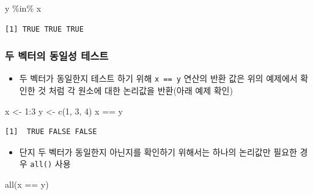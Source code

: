\documentclass[
  11pt,
]{krantz}
\newenvironment{Shaded}{\begin{snugshade}}{\end{snugshade}}
\newcommand{\DecValTok}[1]{\textcolor[rgb]{0.06,0.06,0.06}{#1}}
\newcommand{\FunctionTok}[1]{\textcolor[rgb]{0,0,0}{#1}}
\newcommand{\NormalTok}[1]{#1}
\newcommand{\OtherTok}[1]{\textcolor[rgb]{0.37,0.37,0.37}{#1}}
\newcommand{\SpecialCharTok}[1]{\textcolor[rgb]{0,0,0}{#1}}
\providecommand{\tightlist}{%
  \setlength{\itemsep}{0pt}\setlength{\parskip}{0pt}}
\begin{document}
\begin{Shaded}
\begin{Highlighting}[]
\NormalTok{y }\SpecialCharTok{\%in\%}\NormalTok{ x}
\end{Highlighting}
\end{Shaded}

\begin{verbatim}
[1] TRUE TRUE TRUE
\end{verbatim}

\normalsize

\hypertarget{vec-identical}{%
\subsubsection*{\texorpdfstring{\textbf{두 벡터의 동일성 테스트}}{두 벡터의 동일성 테스트}}\label{vec-identical}}


\begin{itemize}
\tightlist
\item
  두 벡터가 동일한지 테스트 하기 위해 \texttt{x\ ==\ y} 연산의 반환 값은 위의 예제에서 확인한 것 처럼 각 원소에 대한 논리값을 반환(아래 예제 확인)
\end{itemize}

\footnotesize

\begin{Shaded}
\begin{Highlighting}[]
\NormalTok{x }\OtherTok{\textless{}{-}} \DecValTok{1}\SpecialCharTok{:}\DecValTok{3}
\NormalTok{y }\OtherTok{\textless{}{-}} \FunctionTok{c}\NormalTok{(}\DecValTok{1}\NormalTok{, }\DecValTok{3}\NormalTok{, }\DecValTok{4}\NormalTok{)}
\NormalTok{x }\SpecialCharTok{==}\NormalTok{ y}
\end{Highlighting}
\end{Shaded}

\begin{verbatim}
[1]  TRUE FALSE FALSE
\end{verbatim}

\normalsize

\begin{itemize}
\tightlist
\item
  단지 두 벡터가 동일한지 아닌지를 확인하기 위해서는 하나의 논리값만 필요한 경우 \texttt{all()} 사용
\end{itemize}

\footnotesize

\begin{Shaded}
\begin{Highlighting}[]
\FunctionTok{all}\NormalTok{(x }\SpecialCharTok{==}\NormalTok{ y)}
\end{Highlighting}
\end{Shaded}
\end{document}
